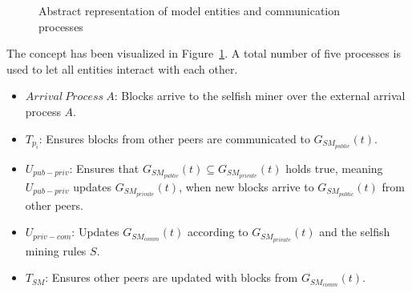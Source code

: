 \begin{figure}
\begin{center}
\end{center}
   \caption{Abstract representation of model entities and communication processes}
\label{fig:model_vis}

\end{figure}
The concept has been visualized in Figure~\ref{fig:model_vis}.
A total number of five processes is used to let all entities interact with each other.
\begin{itemize}
\item $Arrival~Process~A$: Blocks arrive to the selfish miner over the external arrival process $A$.

\item $T_{p_i}$: Ensures blocks from other peers are communicated to $G_{SM_{public}}(t)$.
\item $U_{pub-priv}$: Ensures that $G_{SM_{public}}(t)\subseteq G_{SM_{private}}(t)$ holds true, meaning $U_{pub-priv}$ updates $G_{SM_{private}}(t)$, when new blocks arrive to $G_{SM_{public}}(t)$ from other peers.
\item $U_{priv-com}$: Updates $G_{SM_{comm}}(t)$ according to $G_{SM_{private}}(t)$ and the selfish mining rules $S$.

\item $T_{SM}$: Ensures other peers are updated with blocks from $G_{SM_{comm}}(t)$.
\end{itemize}

